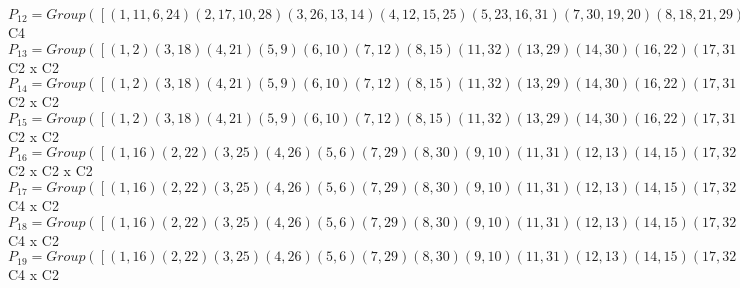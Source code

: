 \documentclass[varwidth=\maxdimen,border=10]{standalone}
\begin{document}
\begin{tabular}
$P_{12} = Group( [ ( 1,11, 6,24)( 2,17,10,28)( 3,26,13,14)( 4,12,15,25)( 5,23,16,31)( 7,30,19,20)( 8,18,21,29)( 9,27,22,32), ( 1, 6)( 2,10)( 3,13)( 4,15)( 5,16)( 7,19)( 8,21)( 9,22)(11,24)(12,25)(14,26)(17,28)(18,29)(20,30)(23,31)(27,32) ] )\cong$ C4\ \\
$P_{13} = Group( [ ( 1, 2)( 3,18)( 4,21)( 5, 9)( 6,10)( 7,12)( 8,15)(11,32)(13,29)(14,30)(16,22)(17,31)(19,25)(20,26)(23,28)(24,27), ( 1, 6)( 2,10)( 3,13)( 4,15)( 5,16)( 7,19)( 8,21)( 9,22)(11,24)(12,25)(14,26)(17,28)(18,29)(20,30)(23,31)(27,32) ] )\cong$ C2 x C2\ \\
$P_{14} = Group( [ ( 1, 2)( 3,18)( 4,21)( 5, 9)( 6,10)( 7,12)( 8,15)(11,32)(13,29)(14,30)(16,22)(17,31)(19,25)(20,26)(23,28)(24,27), ( 1, 5)( 2, 9)( 3,12)( 4,14)( 6,16)( 7,18)( 8,20)(10,22)(11,23)(13,25)(15,26)(17,27)(19,29)(21,30)(24,31)(28,32) ] )\cong$ C2 x C2\ \\
$P_{15} = Group( [ ( 1, 2)( 3,18)( 4,21)( 5, 9)( 6,10)( 7,12)( 8,15)(11,32)(13,29)(14,30)(16,22)(17,31)(19,25)(20,26)(23,28)(24,27), ( 1,16)( 2,22)( 3,25)( 4,26)( 5, 6)( 7,29)( 8,30)( 9,10)(11,31)(12,13)(14,15)(17,32)(18,19)(20,21)(23,24)(27,28) ] )\cong$ C2 x C2\ \\
$P_{16} = Group( [ ( 1,16)( 2,22)( 3,25)( 4,26)( 5, 6)( 7,29)( 8,30)( 9,10)(11,31)(12,13)(14,15)(17,32)(18,19)(20,21)(23,24)(27,28), ( 1, 5)( 2, 9)( 3,12)( 4,14)( 6,16)( 7,18)( 8,20)(10,22)(11,23)(13,25)(15,26)(17,27)(19,29)(21,30)(24,31)(28,32), ( 1, 2)( 3,18)( 4,21)( 5, 9)( 6,10)( 7,12)( 8,15)(11,32)(13,29)(14,30)(16,22)(17,31)(19,25)(20,26)(23,28)(24,27) ] )\cong$ C2 x C2 x C2\ \\
$P_{17} = Group( [ ( 1,16)( 2,22)( 3,25)( 4,26)( 5, 6)( 7,29)( 8,30)( 9,10)(11,31)(12,13)(14,15)(17,32)(18,19)(20,21)(23,24)(27,28), ( 1, 5)( 2, 9)( 3,12)( 4,14)( 6,16)( 7,18)( 8,20)(10,22)(11,23)(13,25)(15,26)(17,27)(19,29)(21,30)(24,31)(28,32), ( 1,21,16,20)( 2,15,22,14)( 3,32,25,17)( 4, 9,26,10)( 5,30, 6, 8)( 7,31,29,11)(12,28,13,27)(18,24,19,23) ] )\cong$ C4 x C2\ \\
$P_{18} = Group( [ ( 1,16)( 2,22)( 3,25)( 4,26)( 5, 6)( 7,29)( 8,30)( 9,10)(11,31)(12,13)(14,15)(17,32)(18,19)(20,21)(23,24)(27,28), ( 1, 5)( 2, 9)( 3,12)( 4,14)( 6,16)( 7,18)( 8,20)(10,22)(11,23)(13,25)(15,26)(17,27)(19,29)(21,30)(24,31)(28,32), ( 1,11, 6,24)( 2,17,10,28)( 3,26,13,14)( 4,12,15,25)( 5,23,16,31)( 7,30,19,20)( 8,18,21,29)( 9,27,22,32) ] )\cong$ C4 x C2\ \\
$P_{19} = Group( [ ( 1,16)( 2,22)( 3,25)( 4,26)( 5, 6)( 7,29)( 8,30)( 9,10)(11,31)(12,13)(14,15)(17,32)(18,19)(20,21)(23,24)(27,28), ( 1, 5)( 2, 9)( 3,12)( 4,14)( 6,16)( 7,18)( 8,20)(10,22)(11,23)(13,25)(15,26)(17,27)(19,29)(21,30)(24,31)(28,32), ( 1,18, 6,29)( 2,12,10,25)( 3,22,13, 9)( 4,32,15,27)( 5, 7,16,19)( 8,31,21,23)(11,20,24,30)(14,28,26,17) ] )\cong$ C4 x C2\ \\

\end{tabular}
\end{document}
